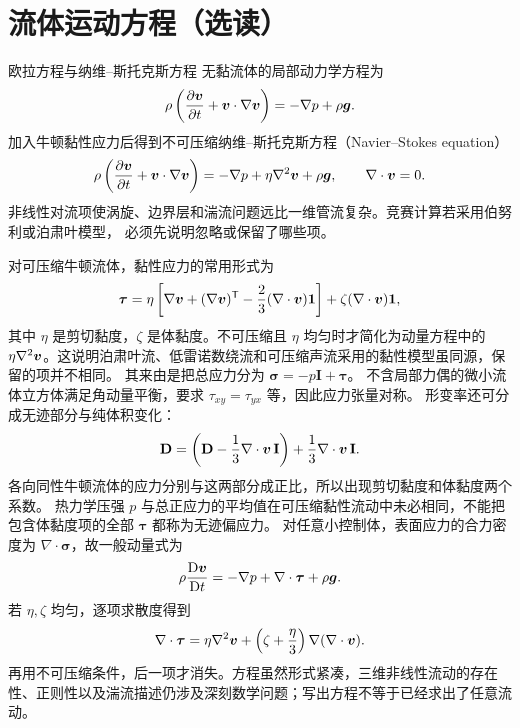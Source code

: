 \section{流体运动方程（选读）}\label{ch13:sec:equations-reading}
\begingroup{}\begin{starread}{欧拉方程与纳维--斯托克斯方程}
无黏流体的局部动力学方程为
\[
 \rho\left(\frac{\partial\bm{v}}{\partial t}+\bm{v}\cdot\nabla\bm{v}\right)
 =-\nabla p+\rho\bm{g}.
\]
加入牛顿黏性应力后得到不可压缩纳维--斯托克斯方程（Navier--Stokes equation）
\[
 \rho\left(\frac{\partial\bm{v}}{\partial t}+\bm{v}\cdot\nabla\bm{v}\right)
 =-\nabla p+\eta\nabla^2\bm{v}+\rho\bm{g},
 \qquad \nabla\cdot\bm{v}=0.
\]
非线性对流项使涡旋、边界层和湍流问题远比一维管流复杂。竞赛计算若采用伯努利或泊肃叶模型，
必须先说明忽略或保留了哪些项。

对可压缩牛顿流体，黏性应力的常用形式为
\[
 \boldsymbol\tau=\eta\left[\nabla\bm{v}+(\nabla\bm{v})^{\mathsf T}
 -\frac23(\nabla\cdot\bm{v})\mathbf 1\right]+\zeta(\nabla\cdot\bm{v})\mathbf 1,
\]
其中 $\eta$ 是剪切黏度，$\zeta$ 是体黏度。不可压缩且 $\eta$ 均匀时才简化为动量方程中的 $\eta\nabla^2\bm{v}$。这说明泊肃叶流、低雷诺数绕流和可压缩声流采用的黏性模型虽同源，保留的项并不相同。
其来由是把总应力分为 $\boldsymbol\sigma=-p\mathbf I+\boldsymbol\tau$。
不含局部力偶的微小流体立方体满足角动量平衡，要求 $\tau_{xy}=\tau_{yx}$ 等，因此应力张量对称。
形变率还可分成无迹部分与纯体积变化：
\[
 \mathbf D=\left(\mathbf D-\frac13\nabla\cdot\bm{v}\,\mathbf I\right)
 +\frac13\nabla\cdot\bm{v}\,\mathbf I.
\]
各向同性牛顿流体的应力分别与这两部分成正比，所以出现剪切黏度和体黏度两个系数。
热力学压强 $p$ 与总正应力的平均值在可压缩黏性流动中未必相同，不能把包含体黏度项的全部 $\boldsymbol\tau$ 都称为无迹偏应力。
对任意小控制体，表面应力的合力密度为 $\nabla\cdot\boldsymbol\sigma$，故一般动量式为
\[
 \rho\frac{\mathrm D\bm{v}}{\mathrm Dt}=-\nabla p+\nabla\cdot\boldsymbol\tau+\rho\bm{g}.
\]
若 $\eta,\zeta$ 均匀，逐项求散度得到
\[
 \nabla\cdot\boldsymbol\tau=\eta\nabla^2\bm{v}+
 \left(\zeta+\frac\eta3\right)\nabla(\nabla\cdot\bm{v}).
\]
再用不可压缩条件，后一项才消失。方程虽然形式紧凑，三维非线性流动的存在性、正则性以及湍流描述仍涉及深刻数学问题；写出方程不等于已经求出了任意流动。
\end{starread}\endgroup

